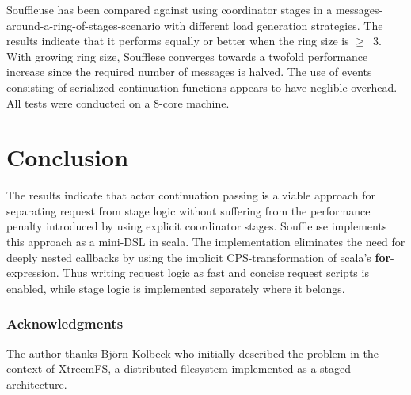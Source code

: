 \documentclass{sig-alternate}
\begin{document}


Souffleuse has been compared against using coordinator stages in a
messages-around-a-ring-of-stages-scenario with different load generation strategies. The results
indicate that it performs equally or better when the ring size is $\ge$~3. With growing ring size,
Soufflese converges towards a twofold performance increase since the required number of messages is
halved. The use of events consisting of serialized continuation functions appears to have neglible
overhead. All tests were conducted on a 8-core machine.


\section{Conclusion}

The results indicate that actor continuation passing is a viable approach for separating request
from stage logic without suffering from the performance penalty introduced by using explicit
coordinator stages. Souffleuse implements this approach as a mini-DSL in scala. The implementation
eliminates the need for deeply nested callbacks by using the implicit CPS-transformation of scala's
\textbf{for}-expression. Thus writing request logic as fast and concise request scripts is enabled,
while stage logic is implemented separately where it belongs.

\subsubsection*{Acknowledgments}

The author thanks Bj\"orn Kolbeck who initially described the problem in the context of XtreemFS,
a distributed filesystem implemented as a staged architecture.
           

  
\end{document}
